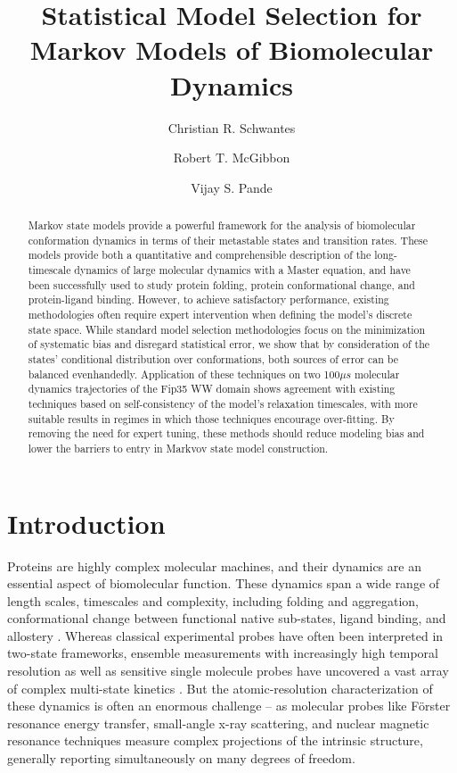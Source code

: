 \documentclass[journal=jpcbfk, layout=traditional, manuscript=article]{achemso}
\title{Statistical Model Selection for Markov Models of Biomolecular Dynamics}
\author{Christian R. Schwantes}
\affiliation{Department of Chemistry, Stanford University, Stanford CA 94305, USA}
\author{Robert T. McGibbon}
\affiliation{Department of Chemistry, Stanford University, Stanford CA 94305, USA}
\author{Vijay S. Pande}
\affiliation{Department of Chemistry, Stanford University, Stanford CA 94305, USA}
\begin{document}
\maketitle
\begin{abstract}
Markov state models provide a powerful framework for the analysis of biomolecular conformation dynamics in terms of their metastable states and transition rates. These models provide both a quantitative and comprehensible description of the long-timescale dynamics of large molecular dynamics with a Master equation, and have been successfully used to study protein folding, protein conformational change, and protein-ligand binding. However, to achieve satisfactory performance, existing methodologies often require expert intervention when defining the model's discrete state space. While standard model selection methodologies focus on the minimization of systematic bias and disregard statistical error, we show that by consideration of the states' conditional distribution over conformations, both sources of error can be balanced evenhandedly. Application of these techniques on two 100$\mu s$ molecular dynamics trajectories of the Fip35 WW domain shows agreement with existing techniques based on self-consistency of the model's relaxation timescales, with more suitable results in regimes in which those techniques encourage over-fitting. By removing the need for expert tuning, these methods should reduce modeling bias and lower the barriers to entry in Markvov state model construction.
\end{abstract}

\section{Introduction}
Proteins are highly complex molecular machines, and their dynamics are an essential aspect of biomolecular function. These dynamics span a wide range of length scales, timescales and complexity, including folding and aggregation, conformational change between functional native sub-states, ligand binding, and allostery \cite{Dobson2003Protein, Kim2008Real, Austin1975Dynamics, Bahar2007Intrinsic}. Whereas classical experimental probes have often been interpreted in two-state frameworks, ensemble measurements with increasingly high temporal resolution as well as sensitive single molecule probes have uncovered a vast array of complex multi-state kinetics \cite{Cosa2006Evidence, Zhang2011Direct}. But the atomic-resolution characterization of these dynamics is often an enormous challenge -- as molecular probes like F\"{o}rster resonance energy transfer, small-angle x-ray scattering, and nuclear magnetic resonance techniques measure complex projections of the intrinsic structure, generally reporting simultaneously on many degrees of freedom\cite{Mertens2010Structural, Tzeng2011Protein}.
\end{document}
